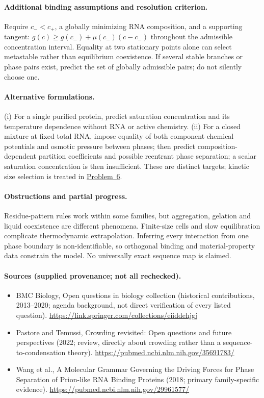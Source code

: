 \documentclass[11pt]{article}
\begin{document}
\paragraph{Additional binding assumptions and resolution criterion.} Require $c_-<c_+$, a globally minimizing RNA composition, and a supporting tangent: $g(c)\geq g(c_-)+\mu(c_-)(c-c_-)$ throughout the admissible concentration interval. Equality at two stationary points alone can select metastable rather than equilibrium coexistence. If several stable branches or phase pairs exist, predict the set of globally admissible pairs; do not silently choose one.

\paragraph{Alternative formulations.} (i) For a single purified protein, predict saturation concentration and its temperature dependence without RNA or active chemistry. (ii) For a closed mixture at fixed total RNA, impose equality of both component chemical potentials and osmotic pressure between phases; then predict composition-dependent partition coefficients and possible reentrant phase separation; a scalar saturation concentration is then insufficient. These are distinct targets; kinetic size selection is treated in \href{https://we-solve.github.io/problems/nonequilibrium-condensates-897aba0c/}{Problem~6}.
\paragraph{Obstructions and partial progress.} Residue-pattern rules work within some families, but aggregation, gelation and liquid coexistence are different phenomena. Finite-size cells and slow equilibration complicate thermodynamic extrapolation. Inferring every interaction from one phase boundary is non-identifiable, so orthogonal binding and material-property data constrain the model. No universally exact sequence map is claimed.
\paragraph{Sources (supplied provenance; not all rechecked).}
\begin{itemize}
\item BMC Biology, Open questions in biology collection (historical contributions, 2013--2020; agenda background, not direct verification of every listed question). \url{https://link.springer.com/collections/eiiddehjgj}
\item Pastore and Temussi, Crowding revisited: Open questions and future perspectives (2022; review, directly about crowding rather than a sequence-to-condensation theory). \url{https://pubmed.ncbi.nlm.nih.gov/35691783/}
\item Wang et al., A Molecular Grammar Governing the Driving Forces for Phase Separation of Prion-like RNA Binding Proteins (2018; primary family-specific evidence). \url{https://pubmed.ncbi.nlm.nih.gov/29961577/}
\end{itemize}
\end{document}
